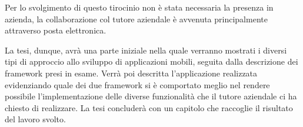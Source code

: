     Per lo svolgimento di questo tirocinio non è stata necessaria la presenza in
    azienda, la collaborazione col tutore aziendale è avvenuta principalmente
    attraverso posta elettronica.

    La tesi, dunque, avrà una parte iniziale nella quale verranno mostrati i
    diversi tipi di approccio allo sviluppo di applicazioni mobili, seguita 
    dalla descrizione dei frame\-work presi in esame. Verrà poi descritta 
    l'applicazione realizzata evidenziando quale dei due frame\-work si è 
    comportato meglio nel rendere possibile l'implementazione delle diverse 
    funzionalità che il tutore aziendale ci ha chiesto di realizzare. La tesi 
    concluderà con un capitolo che raccoglie il risultato del lavoro svolto.
